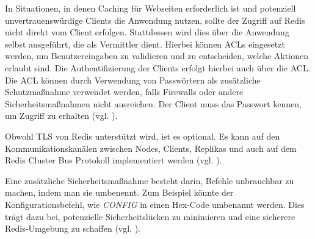 In Situationen, in denen Caching für Webseiten erforderlich ist und potenziell unvertrauenswürdige Clients die Anwendung nutzen, sollte der Zugriff auf Redis nicht direkt vom Client erfolgen. Stattdessen wird dies über die Anwendung selbst ausgeführt, die als Vermittler dient.
Hierbei können \acp{ACL} eingesetzt werden, um Benutzereingaben zu validieren und zu entscheiden, welche Aktionen erlaubt sind. Die Authentifizierung der Clients erfolgt hierbei auch über die \acs{ACL}.
Die \acs{ACL} können durch Verwendung von Passwörtern als zusätzliche Schutzmaßnahme verwendet werden, falls Firewalls oder andere Sicherheitsmaßnahmen nicht ausreichen. Der Client muss das Passwort kennen, um Zugriff zu erhalten (vgl. \cite{Redis-Security}).

Obwohl \ac{TLS} von \ac{Redis} unterstützt wird, ist es optional. Es kann auf den Kommunikationskanälen zwischen Nodes, Clients, Replikas und auch auf dem \acs{Redis} Cluster Bus Protokoll implementiert werden (vgl. \cite{Redis-Security}).

Eine zusätzliche Sicherheitsmaßnahme besteht darin, Befehle unbrauchbar zu machen, indem man sie umbenennt. Zum Beispiel könnte der Konfigurationsbefehl, wie \textit{CONFIG} in einen Hex-Code umbenannt werden. Dies trägt dazu bei, potenzielle Sicherheitslücken zu minimieren und eine sicherere \acs{Redis}-Umgebung zu schaffen (vgl. \cite{Redis-Security}).
